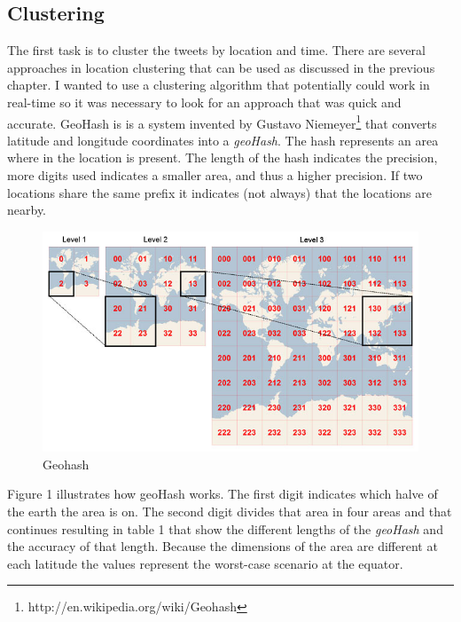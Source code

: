 \documentclass[
10pt, %
a4paper, %
oneside, %
headinclude,footinclude, %
BCOR5mm, %
]{scrartcl}
\begin{document}
\subsection{Clustering}
The first task is to cluster the tweets by location and time. There are several approaches in location clustering that can be used as discussed in the previous chapter. I wanted to use a clustering algorithm that potentially could work in real-time so it was necessary to look for an approach that was quick and accurate. GeoHash is is a system invented by Gustavo Niemeyer\footnote{http://en.wikipedia.org/wiki/Geohash} that converts latitude and longitude coordinates into a \textit{geoHash}. The hash represents an area where in the location is present. The length of the hash indicates the precision, more digits used indicates a smaller area, and thus a higher precision. If two locations share the same prefix it indicates (not always) that the locations are nearby. 
\begin{figure}[htbp] %
   \centering
   \includegraphics[width=4.5in]{geohash.jpg} 
   \caption{Geohash}
   \label{fig:geohash}
\end{figure}
\hfill \break Figure 1 illustrates how geoHash works. The first digit indicates which halve of the earth the area is on. The second digit divides that area in four areas and that continues resulting in table 1 that show the different lengths of the \textit{geoHash} and the accuracy of that length. Because the dimensions of the area are different at each latitude the values represent the worst-case scenario at the equator.
\end{document}

